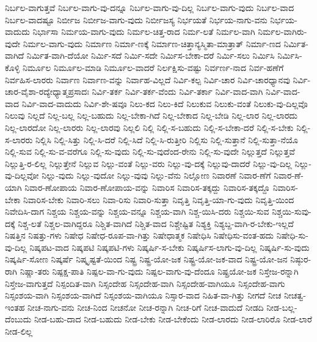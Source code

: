 {ನಿರ್ಬಲ-ವಾಗುತ್ತವೆ
ನಿರ್ಬಲ-ವಾಗು-ವು-ದನ್ನೂ
ನಿರ್ಬಲ-ವಾಗು-ವು-ದಿಲ್ಲ
ನಿರ್ಬಲ-ವಾಗು-ವುದು
ನಿರ್ಬಲ-ವಾದ
ನಿರ್ಬಲ-ವಾದಷ್ಟೂ
ನಿರ್ಬೀಜ
ನಿರ್ಬೀಜ-ವಾಗು-ವುದು
ನಿರ್ಬೀಜಸ್ಯ
ನಿರ್ಭಯತೆ
ನಿರ್ಭಯ-ನಾಗು-ವನು
ನಿರ್ಭಯ-ವಾದುದು
ನಿರ್ಭಾಸಾ
ನಿರ್ಮಯ-ವಾಗು-ವುದು
ನಿರ್ಮಲ-ಚಿತ್ತ-ರಾದ
ನಿರ್ಮ-ಲತೆ
ನಿರ್ಮಲ-ವಾಗಿ
ನಿರ್ಮಲ-ವಾಗಿರು-ವುದೇ
ನಿರ್ಮಲ-ವಾಗು-ವುದು
ನಿರ್ಮಾಣ
ನಿರ್ಮಾ-ಣಕ್ಕೆ
ನಿರ್ಮಾಣ-ಚಿತ್ತಾನ್ಯಸ್ಮಿತಾ-ಮಾತ್ರಾತ್
ನಿರ್ಮಾ-ಣದ
ನಿರ್ಮಿತ-ವಾಗಿದೆ
ನಿರ್ಮಿತ-ವಾಗಿ-ದೆಯೋ
ನಿರ್ಮಿ-ಸದೆ
ನಿರ್ಮಿ-ಸದೇ
ನಿರ್ಮಿಸ-ಬೇಕಾ-ದರೆ
ನಿರ್ಮಿ-ಸಲು
ನಿರ್ಮಿಸಿ
ನಿರ್ಮಿಸಿ-ಕೊಳ್ಳಿ
ನಿರ್ಮೂಲ
ನಿರ್ಮೂಲ-ಮಾಡಿ
ನಿರ್ಮೂಲ-ವಾದರೆ
ನಿರ್ಲಕ್ಷಿಸು-ವಷ್ಟು
ನಿರ್ವರ್ಣ-ನಾದ
ನಿರ್ವ-ಹಣೆಗೆ
ನಿರ್ವಹಿಸ-ಲಾರರು
ನಿರ್ವಾಣ
ನಿರ್ವಾಣ-ವನ್ನು
ನಿರ್ವಾಹ-ವಿಲ್ಲದೆ
ನಿರ್ವಿ-ಕಲ್ಪ
ನಿರ್ವಿ-ಚಾರ
ನಿರ್ವಿ-ಚಾರಧ್ಯಾನವು
ನಿರ್ವಿ-ಚಾರ-ವೈಶಾ-ರದ್ಯೇಧ್ಯಾತ್ಮಪ್ರಸಾದಃ
ನಿರ್ವಿ-ತರ್ಕ
ನಿರ್ವಿ-ತರ್ಕ-ವೆಂದು
ನಿರ್ವಿ-ತರ್ಕಾ
ನಿರ್ವಿ-ವಾದ-ವಾಗಿ
ನಿರ್ವಿ-ವಾದ-ವಾದ
ನಿರ್ವಿ-ವಾದ-ವಾದುದು
ನಿರ್ವಿ-ಶೇ-ಷವೂ
ನಿಲು-ಕದ
ನಿಲು-ಕಿದೆ
ನಿಲುಕುವ
ನಿಲುಕು-ವಂತೆ
ನಿಲುಕು-ವು-ದಿಲ್ಲವೊ
ನಿಲುವು
ನಿಲ್ಲದೆ
ನಿಲ್ಲ-ಬಲ್ಲ
ನಿಲ್ಲ-ಬಹುದು
ನಿಲ್ಲ-ಬೇಕಾ-ಗಿದೆ
ನಿಲ್ಲ-ಬೇಕಾದ
ನಿಲ್ಲ-ಬೇಡಿ
ನಿಲ್ಲ-ಲಾರ
ನಿಲ್ಲ-ಲಾರದು
ನಿಲ್ಲ-ಲಾರದೋ
ನಿಲ್ಲ-ಲಾರರು
ನಿಲ್ಲ-ಲಾರವು
ನಿಲ್ಲಲಿ
ನಿಲ್ಲಿ
ನಿಲ್ಲಿ-ಸ-ಬಹುದು
ನಿಲ್ಲಿ-ಸ-ಬೇಕಾ-ದರೆ
ನಿಲ್ಲಿ-ಸ-ಬೇಕು
ನಿಲ್ಲಿ-ಸ-ಲಾರರು
ನಿಲ್ಲಿಸಿ
ನಿಲ್ಲಿ-ಸಿತ್ತು
ನಿಲ್ಲಿ-ಸಿ-ದರೆ
ನಿಲ್ಲಿ-ಸಿದೆ
ನಿಲ್ಲಿ-ಸಿ-ರುತ್ತೀರಿ
ನಿಲ್ಲಿಸು
ನಿಲ್ಲಿ-ಸುತ್ತಾನೆ
ನಿಲ್ಲಿ-ಸುತ್ತಾ-ನೆಯೊ
ನಿಲ್ಲಿ-ಸುವ
ನಿಲ್ಲಿ-ಸು-ವ-ವರೆಗೂ
ನಿಲ್ಲಿ-ಸು-ವುದು
ನಿಲ್ಲಿ-ಸು-ವುದೆಂದ-ರೇನು
ನಿಲ್ಲಿ-ಸು-ವುದೇ
ನಿಲ್ಲುತ್ತದೆ
ನಿಲ್ಲುತ್ತವೆ
ನಿಲ್ಲುತ್ತಿ-ರ-ಲಿಲ್ಲ
ನಿಲ್ಲುತ್ತೇನೆ
ನಿಲ್ಲುವ
ನಿಲ್ಲು-ವಂತೆ
ನಿಲ್ಲು-ವರು
ನಿಲ್ಲು-ವು-ದಕ್ಕೆ
ನಿಲ್ಲುವು-ದಾದರೆ
ನಿಲ್ಲು-ವು-ದಿಲ್ಲ
ನಿಲ್ಲು-ವು-ದಿಲ್ಲವೋ
ನಿಲ್ಲು-ವುದು
ನಿಲ್ಲು-ವುದೋ
ನಿಲ್ಲು-ವುವು
ನಿಲ್ಲು-ವೆನು
ನಿಲ್ಲೋಣ
ನಿವಾರಣೆ
ನಿವಾರ-ಣೆಗೆ
ನಿವಾರ-ಣೆ-ಯಾಗಿ
ನಿವಾರ-ಣೋಪಾಯ
ನಿವಾರ-ಣೋಪಾಯ-ವನ್ನು
ನಿವಾರಿಸ
ನಿವಾರಿಸ-ತಕ್ಕದ್ದು
ನಿವಾರಿಸ-ತಕ್ಕದ್ದೊ
ನಿವಾರಿಸ-ಬೇಕಾ
ನಿವಾರಿಸ-ಬೇಕು
ನಿವಾರಿ-ಸಲು
ನಿವಾ-ರಿಸು
ನಿವಾರಿ-ಸುತ್ತಾ
ನಿವೃತ್ತಿ
ನಿವೃತ್ತಿ-ಯಾ-ಗು-ವುದು
ನಿವೃತ್ತಿ-ಯಿಂದ
ನಿವೇದಿಸಿ-ದಾಗ
ನಿಶ್ಚಯ
ನಿಶ್ಚಯ-ವನ್ನು
ನಿಶ್ಚಯ-ವನ್ನೂ
ನಿಶ್ಚಯ-ವಾಗಿ
ನಿಶ್ಚ-ಯಿಸಿ-ದರು
ನಿಶ್ಚಯಿ-ಸುವ
ನಿಶ್ಚಯಿ-ಸುವು-ದಕ್ಕೆ
ನಿಶ್ಚ-ಲತೆ
ನಿಶ್ಚಲ-ವಾಗಿದ್ದರೂ
ನಿಶ್ಚಿತ-ವಾಗಿದೆ
ನಿಶ್ಚಿತ-ವಾದ
ನಿಶ್ಚೇಷ್ಟಿತ
ನಿಶ್ಯಕ್ತಿ
ನಿಶ್ಯಬ್ದ-ವಾಗಿ-ರ-ಬೇಕು-ಇಲ್ಲದೆ
ನಿಷತ್ತಿನ
ನಿಷತ್ತು-ಗಳು
ನಿಷೇಧ
ನಿಷೇಧ-ರೂಪ-ವಾ-ಗಿತ್ತು
ನಿಷೇಧಾತ್ಮಕ
ನಿಷೇಧಿಸಿ
ನಿಷೇಧಿಸು-ವಂತ-ಹದು
ನಿಷೇಧಿ-ಸು-ವು-ದಿಲ್ಲ
ನಿಷ್ಕಪಟ-ವಾದ
ನಿಷ್ಕಪಟಿ
ನಿಷ್ಕಪಟಿ-ಗಳು
ನಿಷ್ಕರ್ಷಿ-ಸ-ಬೇಕು
ನಿಷ್ಕರ್ಷಿಸ-ಲಾಗು-ವು-ದಿಲ್ಲ
ನಿಷ್ಕರ್ಷಿ-ಸು-ವುದು
ನಿಷ್ಕರ್ಷಿ-ಸೋಣ
ನಿಷ್ಕರ್ಷೆ
ನಿಷ್ಕೃಷ್ಟತೆ-ಯಿಂದ
ನಿಷ್ಟ್ರ
ನಿಷ್ಟ್ರ-ಯೋ-ಜಕ
ನಿಷ್ಟ್ರ-ಯೋ-ಜಕ-ವಾದ
ನಿಷ್ಟ್ರ-ಯೋ-ಜನ
ನಿಷ್ಠುರ-ರಾಗಿ
ನಿಷ್ಣಾ-ತರು
ನಿಷ್ಪಕ್ಷ-ಪಾತಿ
ನಿಷ್ಪಲ-ವಾ-ಗು-ವುದು
ನಿಷ್ಪಲ-ವಾಗು-ವು-ದೆಂದೂ
ನಿಷ್ಪ್ರಯೋ-ಜಕ
ನಿಸ್ತೇಜ-ರನ್ನಾಗಿ
ನಿಸ್ತೇಜ-ವಾಗುತ್ತದೆ
ನಿಸ್ಪಂದಿತ-ವಾಗಿ
ನಿಸ್ಸಂದೇಹ
ನಿಸ್ಸಂದೇಹ-ವಾಗಿ
ನಿಸ್ಸಂದೇಹ-ವಾಗಿಯೂ
ನಿಸ್ಸಂದೇಹ-ವಾಗು
ನಿಸ್ಸಂಶಯ-ವಾಗಿ
ನಿಸ್ಸಂಶಯ-ವಾಗಿದೆ
ನಿಸ್ಸಂಶಯ-ವಾಗಿಯೂ
ನಿಸ್ಸಾರ-ವಾದ
ನಿಹಿತ-ವಾ-ಗಿತ್ತು
ನೀಗದೆ
ನೀಚ
ನೀಚತ್ವ-ಇಂತಹ
ನೀಚ-ನಾಗು-ವನು
ನೀಚ-ನಿಂದ
ನೀಚನೋ
ನೀಚ-ರನ್ನಾಗಿ
ನೀಚ-ರಿಗೆ
ನೀಚ-ವಾದುದೆ
ನೀಡದಿ
ನೀಡ-ಬಲ್ಲ-ದೆಂಬುದು
ನೀಡ-ಬಹು-ದಾದ
ನೀಡ-ಬಹುದು
ನೀಡ-ಬೇಕು
ನೀಡ-ಬೇಕೆಂದು
ನೀಡ-ಲಾರದು
ನೀಡ-ಲಾರಿರೊ
ನೀಡ-ಲಾರೆ
ನೀಡ-ಲಿಲ್ಲ
}
